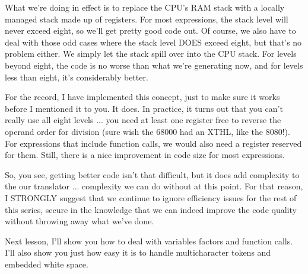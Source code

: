 What we're doing in effect is to replace the CPU's RAM stack with a  locally  managed  stack  made  up  of  registers. For  most expressions, the stack level  will  never  exceed eight, so we'll get pretty good code out. Of course, we also  have  to deal with those  odd cases where the stack level  DOES  exceed  eight, but that's no problem  either. We  simply let the stack spill over into the CPU  stack. For  levels  beyond eight, the code is no worse  than  what  we're generating now, and for levels less than eight, it's considerably better.

For the record, I  have  implemented  this  concept, just to make sure  it  works  before  I  mentioned  it to you. It does. In practice, it turns out that you can't really use all eight levels ... you need at least one register free to  reverse  the  operand order for division  (sure  wish  the  68000 had an XTHL, like the 8080!). For expressions  that  include  function calls, we would also need a register reserved for them. Still, there  is  a  nice improvement in code size for most expressions.

So, you see, getting  better  code  isn't  that difficult, but it does add complexity to the our translator ... complexity  we can do without at this point. For that reason, I  STRONGLY  suggest that we continue to ignore efficiency issues for the rest of this series, secure  in  the knowledge that we can indeed improve the code quality without throwing away what we've done.

Next lesson, I'll show you how to deal with variables factors and function calls. I'll also show you just how easy it is to handle multicharacter tokens and embedded white space.
